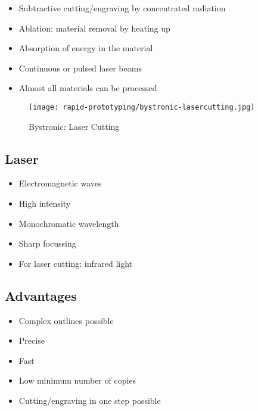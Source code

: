 \documentclass[aspectratio=169]{beamer}
\begin{document}
\begin{frame}
    \begin{itemize}
        \item Subtractive cutting/engraving by concentrated radiation
        \item Ablation: material removal by heating up
        \item Absorption of energy in the material
        \item Continuous or pulsed laser beams
        \item Almost all materials can be processed
    \end{itemize}
    \begin{figure}
        \texttt{[image: rapid-prototyping/bystronic-lasercutting.jpg]}
        \caption{Bystronic: Laser Cutting}
    \end{figure}
\end{frame}

\subsection{Laser}

\begin{frame}
    \begin{itemize}
        \item Electromagnetic waves
        \item High intensity
        \item Monochromatic wavelength
        \item Sharp focussing
        \item For laser cutting: infrared light
    \end{itemize}
\end{frame}

\subsection{Advantages}

\begin{frame}
    \begin{itemize}
        \item Complex outlines possible
        \item Precise
        \item Fast
        \item Low minimum number of copies
        \item Cutting/engraving in one step possible
    \end{itemize}
\end{frame}
\end{document}
